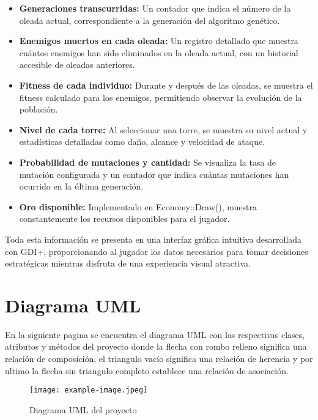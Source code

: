 \documentclass[a4paper,num-refs]{oup-contemporary}
\begin{document}
\begin{itemize}
    \item \textbf{Generaciones transcurridas:} Un contador que indica el número de la oleada actual, correspondiente a la generación del algoritmo genético.
    \item \textbf{Enemigos muertos en cada oleada:} Un registro detallado que muestra cuántos enemigos han sido eliminados en la oleada actual, con un historial accesible de oleadas anteriores.
    \item \textbf{Fitness de cada individuo:} Durante y después de las oleadas, se muestra el fitness calculado para los enemigos, permitiendo observar la evolución de la población.
    \item \textbf{Nivel de cada torre:} Al seleccionar una torre, se muestra su nivel actual y estadísticas detalladas como daño, alcance y velocidad de ataque.
    \item \textbf{Probabilidad de mutaciones y cantidad:} Se visualiza la tasa de mutación configurada y un contador que indica cuántas mutaciones han ocurrido en la última generación.
    \item \textbf{Oro disponible:} Implementado en Economy::Draw(), muestra constantemente los recursos disponibles para el jugador.
\end{itemize}

Toda esta información se presenta en una interfaz gráfica intuitiva desarrollada con GDI+, proporcionando al jugador los datos necesarios para tomar decisiones estratégicas mientras disfruta de una experiencia visual atractiva.

\section{Diagrama UML}
En la siguiente pagina se encuentra el diagrama UML con las respectivas clases, atributos y métodos del proyecto donde la flecha con rombo relleno significa una relación de composición, el triangulo vacío significa una relación de herencia y por ultimo la flecha sin triangulo completo establece una relación de asociación. 


\newpage
\newpage
\begin{figure*}%
\centering
\texttt{[image: example-image.jpeg]}
\caption{Diagrama UML del proyecto}\label{fig:example:wide}
\end{figure*}
\end{document}
